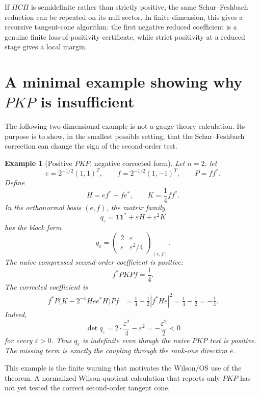 \documentclass[11pt]{article}
\newtheorem{example}[theorem]{Example}
\newcommand{\one}{\mathbf 1}
\newcommand{\eps}{\varepsilon}
\begin{document}
If \(\Pi C\Pi\) is semidefinite rather than strictly positive, the same Schur--Feshbach reduction can be repeated on its null sector.  In finite dimension, this gives a recursive tangent-cone algorithm: the first negative reduced coefficient is a genuine finite loss-of-positivity certificate, while strict positivity at a reduced stage gives a local margin.

\section{A minimal example showing why \texorpdfstring{\(PKP\)}{PKP} is insufficient}
\label{sec:minimal-example}

The following two-dimensional example is not a gauge-theory calculation.  Its purpose is to show, in the smallest possible setting, that the Schur--Feshbach correction can change the sign of the second-order test.

\begin{example}[Positive \(PKP\), negative corrected form]
\label{ex:naive-PKP-fails}
Let \(n=2\), let
\[
  e=2^{-1/2}(1,1)^T,
  \qquad
  f=2^{-1/2}(1,-1)^T,
  \qquad
  P=ff^*.
\]
Define
\begin{equation}
  H=ef^*+fe^*,
  \qquad
  K=\frac14 ff^*.
  \label{eq:toy-HK}
\end{equation}
In the orthonormal basis \((e,f)\), the matrix family
\[
  q_\eps=\one\one^*+\eps H+\eps^2K
\]
has the block form
\begin{equation}
  q_\eps
  =
  \begin{pmatrix}
    2 & \eps\\
    \eps & \eps^2/4
  \end{pmatrix}_{(e,f)}.
  \label{eq:toy-block}
\end{equation}
The naive compressed second-order coefficient is positive:
\[
  f^*PKPf=\frac14.
\]
The corrected coefficient is
\begin{align*}
  f^*P\bigl(K-2^{-1}Hee^*H\bigr)Pf
  &=\frac14-\frac12|f^*He|^2
  =\frac14-\frac12
  =-\frac14.
\end{align*}
Indeed,
\[
  \det q_\eps=2\cdot\frac{\eps^2}{4}-\eps^2=-\frac{\eps^2}{2}<0
\]
for every \(\eps>0\).  Thus \(q_\eps\) is indefinite even though the naive \(PKP\) test is positive.  The missing term is exactly the coupling through the rank-one direction \(e\).
\end{example}

This example is the finite warning that motivates the Wilson/OS use of the theorem.  A normalized Wilson quotient calculation that reports only \(PKP\) has not yet tested the correct second-order tangent cone.
\end{document}
